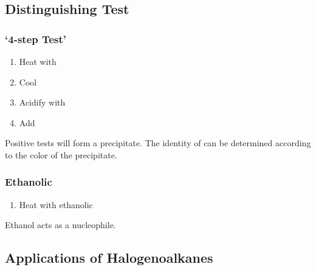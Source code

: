 \documentclass[../main]{subfiles}
\begin{document}
	\subsection{Distinguishing Test}

	\subsubsection{`4-step Test'}

	\begin{enumerate}
		\item Heat with 
		\item Cool
		\item Acidify with 
		\item Add 
	\end{enumerate}

	Positive tests will form a  precipitate. The identity of  can be determined according to the color of the precipitate.

	\subsubsection{Ethanolic }

	\begin{enumerate}
		\item Heat with ethanolic 
	\end{enumerate}

	Ethanol acts as a nucleophile.

	\subsection{Applications of Halogenoalkanes}
	
\end{document}
